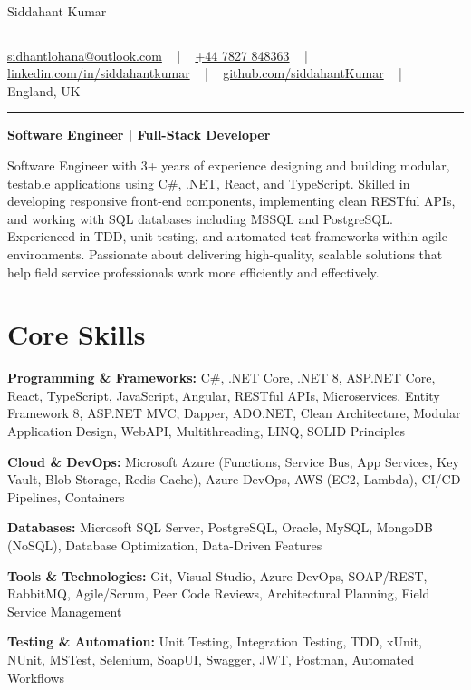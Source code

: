 \documentclass[letterpaper,10pt]{article}
\newcommand{\documentTitle}[2]{
  \begin{center}
    \vspace*{-0.3in}
    {\Huge\color{accentTitle} #1}
    \vspace{8pt}
    {\color{accentLine} \hrule}
    \vspace{2pt}
    \footnotesize{#2}
    \vspace{2pt}
    {\color{accentLine} \hrule}
  \end{center}
}
\newenvironment{resume_list}{
  \vspace{-7pt}
  \begin{itemize}[itemsep=-2px, parsep=1pt, leftmargin=30pt]
}{
  \end{itemize}
}
\begin{document}
\documentTitle{Siddahant Kumar}{
\vspace{0.1cm}
\href{mailto:sidhantlohana@outlook.com}{sidhantlohana@outlook.com} ~ | ~
\href{tel:+447827848363}{+44 7827 848363} ~ | ~
\href{https://www.linkedin.com/in/siddahantkumar/}{linkedin.com/in/siddahantkumar} ~ | ~
\href{https://github.com/siddahantKumar}{github.com/siddahantKumar} ~ | ~
England, UK
}

\begin{center}
\textbf{Software Engineer | Full-Stack Developer}
\end{center}

Software Engineer with 3+ years of experience designing and building modular, testable applications using C\#, .NET, React, and TypeScript. Skilled in developing responsive front-end components, implementing clean RESTful APIs, and working with SQL databases including MSSQL and PostgreSQL. Experienced in TDD, unit testing, and automated test frameworks within agile environments. Passionate about delivering high-quality, scalable solutions that help field service professionals work more efficiently and effectively.


\section{Core Skills}

\begin{resume_list}
    \item \textbf{Programming \& Frameworks:} C\#, .NET Core, .NET 8, ASP.NET Core, React, TypeScript, JavaScript, Angular, RESTful APIs, Microservices, Entity Framework 8, ASP.NET MVC, Dapper, ADO.NET, Clean Architecture, Modular Application Design, WebAPI, Multithreading, LINQ, SOLID Principles
    \item \textbf{Cloud \& DevOps:} Microsoft Azure (Functions, Service Bus, App Services, Key Vault, Blob Storage, Redis Cache), Azure DevOps, AWS (EC2, Lambda), CI/CD Pipelines, Containers
    \item \textbf{Databases:} Microsoft SQL Server, PostgreSQL, Oracle, MySQL, MongoDB (NoSQL), Database Optimization, Data-Driven Features
    \item \textbf{Tools \& Technologies:} Git, Visual Studio, Azure DevOps, SOAP/REST, RabbitMQ, Agile/Scrum, Peer Code Reviews, Architectural Planning, Field Service Management
    \item \textbf{Testing \& Automation:} Unit Testing, Integration Testing, TDD, xUnit, NUnit, MSTest, Selenium, SoapUI, Swagger, JWT, Postman, Automated Workflows
\end{resume_list}
\end{document}
